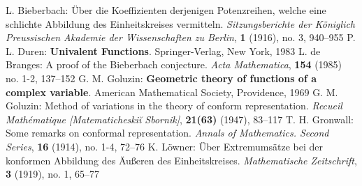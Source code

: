\begin{thebibliography}{widest entry}
   L. Bieberbach: Über die Koeffizienten derjenigen Potenzreihen, welche eine schlichte Abbildung des Einheitskreises vermitteln. \textit{Sitzungsberichte der Königlich Preussischen Akademie der Wissenschaften zu Berlin}, \textbf{1} (1916), no. 3, 940--955
   P. L. Duren: \textbf{Univalent Functions}. Springer-Verlag, New York, 1983
   L. de Branges: A proof of the Bieberbach conjecture. \textit{Acta Mathematica}, \textbf{154} (1985) no. 1-2, 137--152
   G. M. Goluzin: \textbf{Geometric theory of functions of a complex variable}. American Mathematical Society, Providence, 1969
   G. M. Goluzin: Method of variations in the theory of conform representation. \textit{Recueil Mathématique [Matematicheskiĭ Sbornik]}, \textbf{21(63)} (1947), 83--117
   T. H. Gronwall: Some remarks on conformal representation. \textit{Annals of Mathematics. Second Series}, \textbf{16} (1914), no. 1-4, 72--76
   K. Löwner: Über Extremumsätze bei der konformen Abbildung des Äußeren des Einheitskreises. \textit{Mathematische Zeitschrift}, \textbf{3} (1919), no. 1, 65--77
\end{thebibliography}
